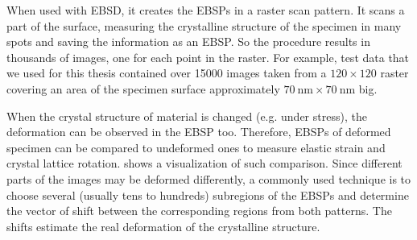When used with EBSD, it creates the EBSPs in a raster scan pattern. It scans a part of the surface, measuring the crystalline structure of the specimen in many spots and saving the information as an EBSP. So the procedure results in thousands of images, one for each point in the raster. For example, test data that we used for this thesis contained over 15000 images taken from a $120 \times 120$ raster covering an area of the specimen surface approximately $\SI{70}{\nano\meter} \times \SI{70}{\nano\meter}$ big.

When the crystal structure of material is changed (e.g. under stress), the deformation can be observed in the EBSP too. Therefore, EBSPs of deformed specimen can be compared to undeformed ones to measure elastic strain and crystal lattice rotation.   shows a visualization of such comparison. Since different parts of the images may be deformed differently, a commonly used technique \cite{wilkinson2006high,wilkinson2010high,britton2012high} is to choose several (usually tens to hundreds) subregions of the EBSPs and determine the vector of shift between the corresponding regions from both patterns. The shifts estimate the real deformation of the crystalline structure.

